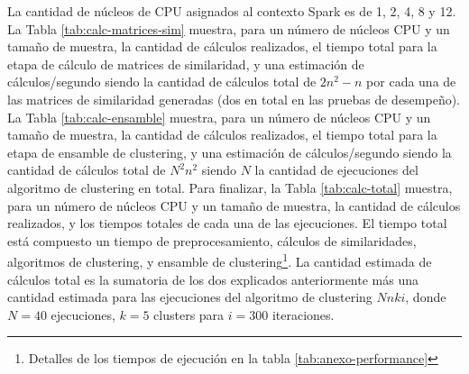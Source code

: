 \bigskip La cantidad de núcleos de CPU asignados al contexto Spark es de 1, 2, 4, 8 y 12. La Tabla \ref{tab:calc-matrices-sim} muestra, para un número de núcleos CPU y un tamaño de muestra, la cantidad de cálculos realizados, el tiempo total para la etapa de cálculo de matrices de similaridad, y una estimación de cálculos/segundo siendo la cantidad de cálculos total de \(2n^2-n\) por cada una de las matrices de similaridad generadas (dos en total en las pruebas de desempeño). La Tabla \ref{tab:calc-ensamble} muestra, para un número de núcleos CPU y un tamaño de muestra, la cantidad de cálculos realizados, el tiempo total para la etapa de ensamble de clustering, y una estimación de cálculos/segundo siendo la cantidad de cálculos total de \(N^2n^2\) siendo \(N\) la cantidad de ejecuciones del algoritmo de clustering en total. Para finalizar, la Tabla \ref{tab:calc-total}  muestra, para un número de núcleos CPU y un tamaño de muestra, la cantidad de cálculos realizados, y los tiempos totales de cada una de las ejecuciones. El tiempo total está compuesto un tiempo de preprocesamiento, cálculos de similaridades, algoritmos de clustering, y ensamble de clustering\footnote{Detalles de los tiempos de ejecución en la tabla \ref{tab:anexo-performance}}. La cantidad estimada de cálculos total es la sumatoria de los dos explicados anteriormente más una cantidad estimada para las ejecuciones del algoritmo de clustering \(Nnki\), donde \(N=40\) ejecuciones, \(k=5\) clusters para \(i=300\) iteraciones.

